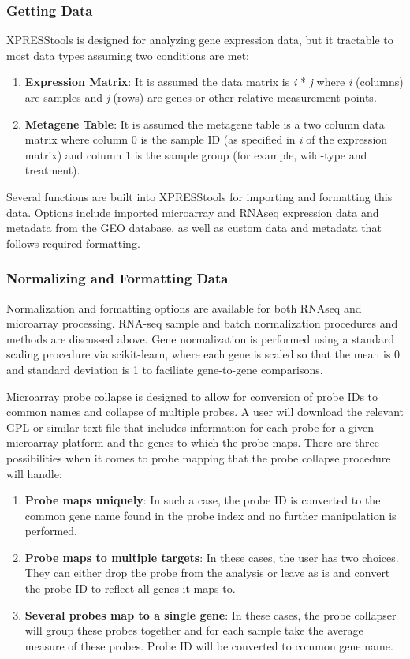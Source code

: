\documentclass[11pt, a4paper, oneside]{article}
\begin{document}
\subsubsection{Getting Data}
XPRESStools is designed for analyzing gene expression data, but it tractable to most data types assuming two conditions are met:

\begin{enumerate}
  \item \textbf{Expression Matrix}: It is assumed the data matrix is \textit{i} * \textit{j} where \textit{i} (columns) are samples and \textit{j} (rows) are genes or other relative measurement points.
  \item \textbf{Metagene Table}: It is assumed the metagene table is a two column data matrix where column 0 is the sample ID (as specified in \textit{i} of the expression matrix) and column 1 is the sample group (for example, wild-type and treatment).
\end{enumerate}

Several functions are built into XPRESStools for importing and formatting this data. Options include imported microarray and RNAseq expression data and metadata from the GEO database, as well as custom data and metadata that follows required formatting.

\subsubsection{Normalizing and Formatting Data}
Normalization and formatting options are available for both RNAseq and microarray processing. RNA-seq sample and batch normalization procedures and methods are discussed above. Gene normalization is performed using a standard scaling procedure via scikit-learn{}, where each gene is scaled so that the mean is 0 and standard deviation is 1 to faciliate gene-to-gene comparisons.

Microarray probe collapse is designed to allow for conversion of probe IDs to common names and collapse of multiple probes. A user will download the relevant GPL or similar text file that includes information for each probe for a given microarray platform and the genes to which the probe maps. There are three possibilities when it comes to probe mapping that the probe collapse procedure will handle:

\begin{enumerate}
  \item \textbf{Probe maps uniquely}: In such a case, the probe ID is converted to the common gene name found in the probe index and no further manipulation is performed.
  \item \textbf{Probe maps to multiple targets}: In these cases, the user has two choices. They can either drop the probe from the analysis or leave as is and convert the probe ID to reflect all genes it maps to.
  \item \textbf{Several probes map to a single gene}: In these cases, the probe collapser will group these probes together and for each sample take the average measure of these probes. Probe ID will be converted to common gene name.
\end{enumerate}
\end{document}
